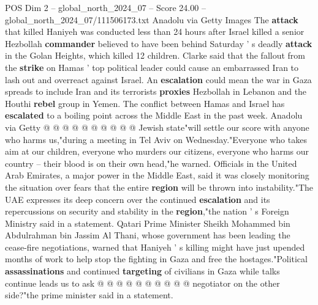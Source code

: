 \begin{textsample}{POS Dim 2 – global\_north\_2024\_07 – Score 24.00 – global\_north\_2024\_07/111506173.txt}
Anadolu via Getty Images The \textbf{attack} that killed Haniyeh was conducted less than 24 hours after Israel killed a senior Hezbollah \textbf{commander} believed to have been behind Saturday ' s deadly \textbf{attack} in the Golan Heights, which killed 12 children.
Clarke said that the fallout from the \textbf{strike} on Hamas ' top political leader could cause an embarrassed Iran to lash out and overreact against Israel.
An \textbf{escalation} could mean the war in Gaza spreads to include Iran and its terrorists \textbf{proxies} Hezbollah in Lebanon and the Houthi \textbf{rebel} group in Yemen.
The conflict between Hamas and Israel has \textbf{escalated} to a boiling point across the Middle East in the past week.
Anadolu via Getty @ @ @ @ @ @ @ @ @ @ Jewish state"will settle our score with anyone who harms us,"during a meeting in Tel Aviv on Wednesday."Everyone who takes aim at our children, everyone who murders our citizens, everyone who harms our country -- their blood is on their own head,"he warned.
Officials in the United Arab Emirates, a major power in the Middle East, said it was closely monitoring the situation over fears that the entire \textbf{region} will be thrown into instability."The UAE expresses its deep concern over the continued \textbf{escalation} and its repercussions on security and stability in the \textbf{region},"the nation ' s Foreign Ministry said in a statement.
Qatari Prime Minister Sheikh Mohammed bin Abdulrahman bin Jassim Al Thani, whose government has been leading the cease-fire negotiations, warned that Haniyeh ' s killing might have just upended months of work to help stop the fighting in Gaza and free the hostages."Political \textbf{assassinations} and continued \textbf{targeting} of civilians in Gaza while talks continue leads us to ask @ @ @ @ @ @ @ @ @ @ negotiator on the other side?"the prime minister said in a statement.

\end{textsample}

